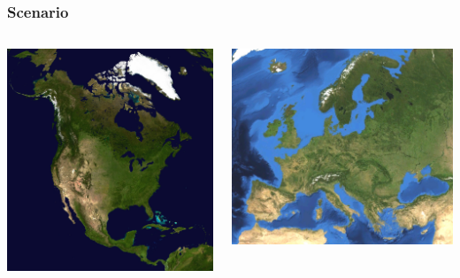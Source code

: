 \documentclass{beamer}
\begin{document}
\begin{frame}
  \frametitle{Scenario}
  \begin{columns}
    \begin{column}{0.5\textwidth}
      \includegraphics[height=0.5\textheight,width=\textwidth,keepaspectratio=true]{figure/na_map}
    \end{column}
    \begin{column}{0.5\textwidth}
      \includegraphics[height=0.7\textheight,width=\textwidth,keepaspectratio=true]{figure/euro}
    \end{column}
  \end{columns}


\end{frame}
\end{document}
